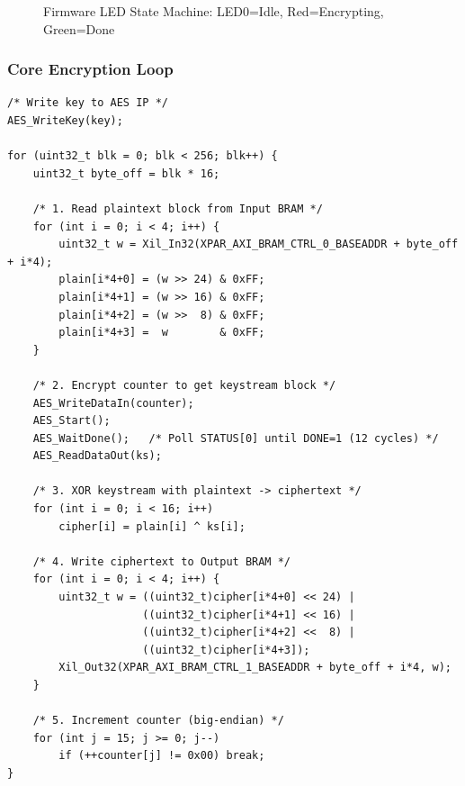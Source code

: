 \begin{figure}[H]
\centering
{}
\caption{Firmware LED State Machine: LED0=Idle, Red=Encrypting, Green=Done}
\label{fig:led_fsm}
\end{figure}

\subsubsection{Core Encryption Loop}

\begin{lstlisting}[style=cstyle, caption={CTR Mode Encryption Loop (from main.c)}]
/* Write key to AES IP */
AES_WriteKey(key);

for (uint32_t blk = 0; blk < 256; blk++) {
    uint32_t byte_off = blk * 16;

    /* 1. Read plaintext block from Input BRAM */
    for (int i = 0; i < 4; i++) {
        uint32_t w = Xil_In32(XPAR_AXI_BRAM_CTRL_0_BASEADDR + byte_off + i*4);
        plain[i*4+0] = (w >> 24) & 0xFF;
        plain[i*4+1] = (w >> 16) & 0xFF;
        plain[i*4+2] = (w >>  8) & 0xFF;
        plain[i*4+3] =  w        & 0xFF;
    }

    /* 2. Encrypt counter to get keystream block */
    AES_WriteDataIn(counter);
    AES_Start();
    AES_WaitDone();   /* Poll STATUS[0] until DONE=1 (12 cycles) */
    AES_ReadDataOut(ks);

    /* 3. XOR keystream with plaintext -> ciphertext */
    for (int i = 0; i < 16; i++)
        cipher[i] = plain[i] ^ ks[i];

    /* 4. Write ciphertext to Output BRAM */
    for (int i = 0; i < 4; i++) {
        uint32_t w = ((uint32_t)cipher[i*4+0] << 24) |
                     ((uint32_t)cipher[i*4+1] << 16) |
                     ((uint32_t)cipher[i*4+2] <<  8) |
                     ((uint32_t)cipher[i*4+3]);
        Xil_Out32(XPAR_AXI_BRAM_CTRL_1_BASEADDR + byte_off + i*4, w);
    }

    /* 5. Increment counter (big-endian) */
    for (int j = 15; j >= 0; j--)
        if (++counter[j] != 0x00) break;
}
\end{lstlisting}

